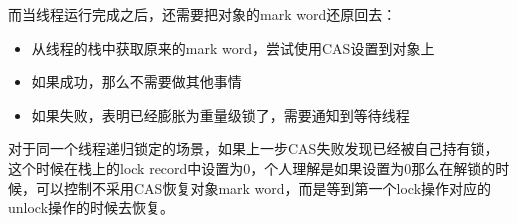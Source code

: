 \documentclass[12pt]{article}
\begin{document}
\begin{Shaded}
\begin{Highlighting}[]
  \OperatorTok{(!}\OperatorTok{)} \OperatorTok{\{}
\OperatorTok{=}\OperatorTok{{-}\textgreater{}}\OperatorTok{(){-}\textgreater{}}\OperatorTok{();}
\OperatorTok{{-}\textgreater{}}\OperatorTok{(){-}\textgreater{}}\OperatorTok{(}\OperatorTok{);}
    \OperatorTok{(}\OperatorTok{::} \OperatorTok{(}\OperatorTok{,}\OperatorTok{{-}\textgreater{}}\OperatorTok{(),}\OperatorTok{)} \OperatorTok{!=}\OperatorTok{)} \OperatorTok{\{}
      \OperatorTok{(}\OperatorTok{{-}\textgreater{}}\OperatorTok{((}\OperatorTok{)}\OperatorTok{{-}\textgreater{}}\OperatorTok{()))} \OperatorTok{\{}
\OperatorTok{{-}\textgreater{}}\OperatorTok{(){-}\textgreater{}}\OperatorTok{(}\OperatorTok{);}
     \OperatorTok{\}}  \OperatorTok{\{}
\OperatorTok{(}\OperatorTok{::}\OperatorTok{(}\OperatorTok{,}\OperatorTok{),}\OperatorTok{);}
     \OperatorTok{\}}
   \OperatorTok{\}}
 \OperatorTok{\}}
\end{Highlighting}
\end{Shaded}

而当线程运行完成之后，还需要把对象的mark word还原回去：

\begin{itemize}
\tightlist
\item
  从线程的栈中获取原来的mark word，尝试使用CAS设置到对象上
\item
  如果成功，那么不需要做其他事情
\item
  如果失败，表明已经膨胀为重量级锁了，需要通知到等待线程
\end{itemize}

对于同一个线程递归锁定的场景，如果上一步CAS失败发现已经被自己持有锁，这个时候在栈上的lock record中设置为0，个人理解是如果设置为0那么在解锁的时候，可以控制不采用CAS恢复对象mark word，而是等到第一个lock操作对应的unlock操作的时候去恢复。
\end{document}
